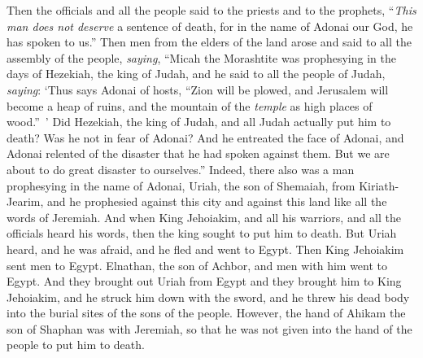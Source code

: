 \begin{biblechapter}
\verse Then the officials and all the people said to the priests and to the prophets, “\textit{This man does not deserve} a sentence of death, for in the name of Adonai our God, he has spoken to us.”
\verse Then men from the elders of the land arose and said to all the assembly of the people, \textit{saying},
\verse “Micah the Morashtite was prophesying in the days of Hezekiah, the king of Judah, and he said to all the people of Judah, \textit{saying}: ‘Thus says Adonai of hosts, 
“Zion will be plowed, 
and Jerusalem will become a heap of ruins, 
and the mountain of the \textit{temple} as high places of wood.” ’
\verse Did Hezekiah, the king of Judah, and all Judah actually put him to death? Was he not in fear of Adonai? And he entreated the face of Adonai, and Adonai relented of the disaster that he had spoken against them. But we are about to do great disaster to ourselves.”
\verse Indeed, there also was a man prophesying in the name of Adonai, Uriah, the son of Shemaiah, from Kiriath-Jearim, and he prophesied against this city and against this land like all the words of Jeremiah.
\verse And when King Jehoiakim, and all his warriors, and all the officials heard his words, then the king sought to put him to death. But Uriah heard, and he was afraid, and he fled and went to Egypt.
\verse Then King Jehoiakim sent men to Egypt. Elnathan, the son of Achbor, and men with him went to Egypt.
\verse And they brought out Uriah from Egypt and they brought him to King Jehoiakim, and he struck him down with the sword, and he threw his dead body into the burial sites of the sons of the people.
\verse However, the hand of Ahikam the son of Shaphan was with Jeremiah, so that he was not given into the hand of the people to put him to death.
\end{biblechapter}

